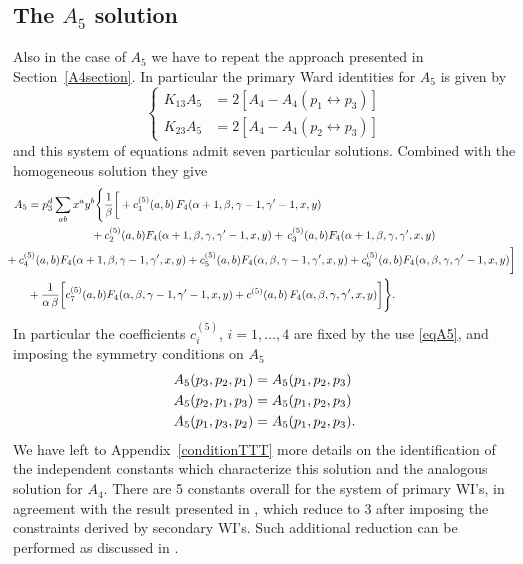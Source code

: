 \documentclass[a4paper,11pt,openright,twoside]{book}
\let\a=\alpha   \let\b=\beta   \let\g=\gamma   \let\d=\delta
\newcommand{\secref}[1]{Section~\ref{#1}}		%
\newcommand{\appref}[1]{Appendix~\ref{#1}}		%
\numberwithin{equation}{section}
\begin{document}
{{\subsection{The $A_5$ solution}
Also in the case of $A_5$ we have to repeat the approach presented in \secref{A4section}. In particular the primary Ward identities for $A_5$ is given by
\begin{equation}
\left\{
\begin{split}
	K_{13} A_5 &=2[A_4- A_4(p_1\leftrightarrow p_3)] \\
	K_{23} A_5&=2[A_4- A_4 (p_2\leftrightarrow p_3)]
\end{split}\right.
\label{eqA5}
\end{equation}
and this system of equations admit seven particular solutions. Combined with the homogeneous solution they give
\begin{align}
A_5&=p_3^{d}\sum_{ab}x^ay^b\Bigg\{\frac{1}{\b}\bigg[+c_1^{(5)}(a,b)\,F_4(\a+1,\b,\g-1,\g'-1,x,y)\notag\\
&\hspace{2cm}+c^{(5)}_2(a,b)F_4(\a+1,\b,\g,\g'-1,x,y)+\,c^{(5)}_3(a,b)F_4(\a+1,\b,\g,\g',x,y)\notag\\
&\hspace{-0.7cm}+c^{(5)}_4(a,b)F_4(\a+1,\b,\g-1,\g',x,y)+c^{(5)}_5(a,b)F_4(\a,\b,\g-1,\g',x,y)+c^{(5)}_6(a,b)F_4(\a,\b,\g,\g'-1,x,y)\bigg]\notag\\
&+\frac{1}{\a\,\b}\bigg[c^{(5)}_7(a,b)F_4(\a,\b,\g-1,\g'-1,x,y)+c^{(5)}(a,b)\,F_4(\a,\b,\g,\g',x,y)\bigg]\Bigg\}. 
\end{align}
In particular the coefficients $c^{(5)}_i$, $i=1,\dots,4$ are fixed by the use \eqref{eqA5}, and imposing the symmetry conditions on $A_5$
\begin{align}
A_5(p_3,p_2,p_1)&=A_5(p_1,p_2,p_3) \notag\\
A_5(p_2,p_1,p_3)&=A_5(p_1,p_2,p_3) \notag\\
A_5(p_1,p_3,p_2)&=A_5(p_1,p_2,p_3).
\end{align}
We have left to \appref{conditionTTT} more details on the identification of the independent constants which characterize this solution and the analogous solution for $A_4$. There are 5 constants overall for the system of primary WI's, in agreement with the result presented in  \cite{Bzowski:2013sza}, which reduce to 3 after imposing the constraints derived by secondary WI's. Such additional reduction can be performed as discussed in \cite{Bzowski:2013sza}. 
}}
\end{document}
